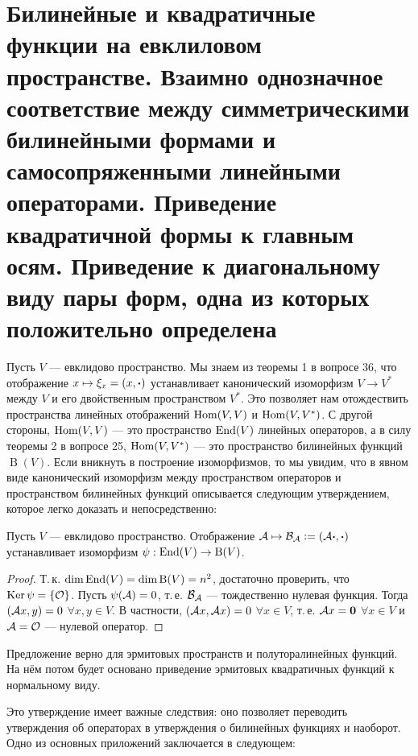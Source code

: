 \section{Билинейные и квадратичные функции на евклиловом пространстве. Взаимно однозначное
соответствие между симметрическими билинейными формами и самосопряженными
линейными операторами. Приведение квадратичной формы к главным осям. Приведение к
диагональному виду пары форм, одна из которых положительно определена}

Пусть $V$ --- евклидово пространство. Мы знаем из теоремы 1 в вопросе 36, что отображение $x \mapsto \xi_x = (x, \boldsymbol{\cdot})$ устанавливает канонический изоморфизм $V \to V^\ast$ между $V$ и его двойственным пространством $V^\ast$. Это позволяет нам отождествить пространства линейных отображений $\operatorname{Hom}(V, V)$ и $\operatorname{Hom}(V, V^\ast)$. С другой стороны, $\operatorname{Hom}(V ,V)$ --- это пространство $\operatorname{End}(V)$ линейных операторов, а в силу теоремы 2 в вопросе 25, $\operatorname{Hom}(V, V^\ast)$ --- это пространство билинейных функций $\operatorname{B}(V)$. Если вникнуть в построение изоморфизмов, то мы увидим, что в явном виде канонический изоморфизм между пространством операторов и пространством билинейных функций описывается следующим утверждением, которое легко доказать и непосредственно:

\begin{proposal}
    Пусть $V$ --- евклидово пространство. Отображение $\mathcal{A} \mapsto \mathcal{B}_{\mathcal{A}} \vcentcolon = (\mathcal{A}\boldsymbol{\cdot}, \boldsymbol{\cdot})$ устанавливает изоморфизм $\psi: \operatorname{End}(V) \to \operatorname{B}(V)$.
\end{proposal}

\begin{proof}
    Т.\,к. $\dim\operatorname{End}(V) = \dim\operatorname{B}(V) = n^2$, достаточно проверить, что $\operatorname{Ker}\psi = \{\mathcal{O}\}$. Пусть $\psi(\mathcal{A}) = 0$, т.\,е. $\mathcal{B}_{\mathcal{A}}$ --- тождественно нулевая функция. Тогда $(\mathcal{A} x, y) = 0$ $\forall x, y \in V$. В частности, $(\mathcal{A} x, \mathcal{A} x) = 0$ $\forall x \in V$, т.\,е. $\mathcal{A} x = \boldsymbol{0}$ $\forall x \in V$ и $\mathcal{A} = \mathcal{O}$ --- нулевой оператор.
\end{proof}

\begin{remark}
    Предложение верно для эрмитовых пространств и полуторалинейных функций. На нём потом будет основано приведение эрмитовых квадратичных функций к нормальному виду.
\end{remark}

Это утверждение имеет важные следствия: оно позволяет переводить утверждения об операторах в утверждения о билинейных функциях и наоборот. Одно из основных приложений заключается в следующем:

